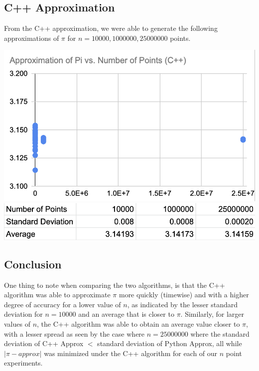 \documentclass[11pt]{article}
\begin{document}
\subsection{C++ Approximation}
From the C++ approximation, we were able to generate the following approximations of $\pi$ for $n = 10000, 1000000, 25000000$ points.
\begin{center}
    \includegraphics[scale = 0.4]{hw1image2.png} \includegraphics[scale = 0.4]{hw1image4.png}
\end{center}
\subsection{Conclusion}
One thing to note when comparing the two algorithms, is that the C++ algorithm was able to approximate $\pi$ more quickly (timewise) and with a higher degree of accuracy for a lower value of $n$, as indicated by the lesser standard deviation for $n = 10000$ and an average that is closer to $\pi$. Similarly, for larger values of $n$, the C++ algorithm was able to obtain an average value closer to $\pi$, with a lesser spread as seen by the case where $n = 25000000$ where the standard deviation of C++ Approx $<$ standard deviation of Python Approx,
all while $|\pi - approx|$ was minimized under the C++ algorithm for each of our $n$ point experiments.
\end{document}
